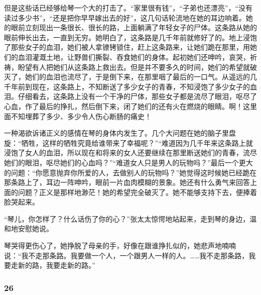 \par 但是这些话已经够给琴一个大的打击了。“家里很有钱”，“子弟也还漂亮”，“没有读过多少书”，“还是把你早早嫁出去的好”，这几句话轮流地在她的耳边响着。她的眼前立刻现出一条很长、很长的路，上面躺满了年轻女子的尸体。这条路从她的眼前伸长出去，一直到无穷。她明白了，这条路是几千年前就修好了的。地上浸饱了那些女子的血泪，她们被人拿镣铐锁住，赶上这条路来，让她们跪在那里，用她们的血泪灌溉土地，让野兽们撕裂、吞食她们的身体。起初她们还呻吟，哀哭，祈祷，盼望有人把她们从这条路上救出去。但是并不要多久的时间，她们的希望就破灭了，她们的血泪也流尽了，于是倒下来，在那里咽了最后的一口气。从遥远的几千年前到现在，这条路上，不知断送了多少女子的青春，不知浸饱了多少女子的血泪。仔细看去，这条路上没有一个干净的尸体，那些女子都是流尽了眼泪，呕尽了心血，作了最后的挣扎，然后倒下来，闭了她们的还有火在燃烧的眼睛。啊！这里面不知埋葬了多少、多少令人伤心断肠的痛史！
\par 一种渴欲诉诸正义的感情在琴的身体内发生了。几个大问题在她的脑子里盘旋：“牺牲，这样的牺牲究竟给谁带来了幸福呢？”“难道因为几千年来这条路上就浸饱了女人的血泪，所以现在和将来的女人还要继续在那里断送她们的青春，流尽她们的眼泪，呕尽她们的心血吗？”“难道女人只是男人的玩物吗？”最后一个更大的问题：“你愿意抛弃你所爱的人，去做别人的玩物吗？”她觉得这时候她已经跪在那条路上了，耳边一阵呻吟，眼前一片血肉模糊的景象。她还有什么勇气来回答上面的问题？正义是那样地渺茫！她的希望完全破灭了。她不能够支持下去，便捧着脸哭起来。
\par “琴儿，你怎样了？什么话伤了你的心？”张太太惊愕地站起来，走到琴的身边，温和地安慰她说。
\par 琴哭得更伤心了，她挣脱了母亲的手，好像在跟谁挣扎似的，她悲声地喃喃说：“我不走那条路。我要做一个人，一个跟男人一样的人。……我不走那条路，我要走新的路，我要走新的路。”


\subsubsection*{26}

